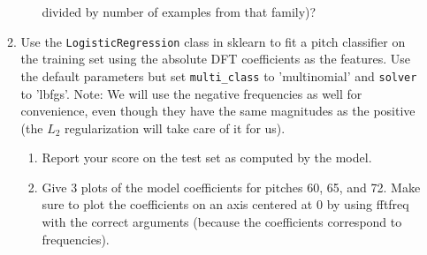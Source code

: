 \documentclass[12pt,twoside]{article}
\begin{document}
\begin{enumerate}
\begin{enumerate}
\begin{enumerate}
      divided by number of examples from that family)?
    \end{enumerate}
  \item Use the \texttt{LogisticRegression} class in sklearn to fit a
    pitch classifier on the training set using the absolute DFT
    coefficients as the features.  Use the default parameters
    but set \texttt{multi\_class} to 'multinomial' and
    \texttt{solver} to 'lbfgs'.  Note: We will use the negative
    frequencies as well for convenience, even though they have the same magnitudes as
    the positive (the $L_2$ regularization will take care of it for us).
    \begin{enumerate}
    \item Report your score on the test set as computed by the model.
    \item Give 3 plots of the model coefficients for pitches 60, 65, and 72.
      Make sure to plot the coefficients on an axis centered at $0$ by using
      fftfreq with the correct arguments (because the coefficients
      correspond to frequencies).
    \end{enumerate}
  \end{enumerate}

 \end{enumerate}
\end{document}
